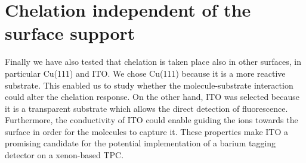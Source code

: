 \documentclass[aps,prl,reprint,longbibliography,superscriptaddress, english]{revtex4-1}
\newcommand{\completar}[1]{{\color{red} #1}}
\begin{document}





\section{Chelation independent of the surface support}

Finally we have also tested that chelation is taken place also in other surfaces, in particular Cu(111) and ITO. We chose Cu(111) because it is a more reactive substrate. This enabled us to study whether the molecule-substrate interaction could alter the chelation response. On the other hand, ITO was selected because it is a transparent substrate which allows the direct detection of fluorescence. Furthermore, the conductivity of ITO could enable guiding the \Bapp ions towards the surface in order for the molecules to capture it. These properties make ITO a promising candidate for the potential implementation of a barium tagging detector on a xenon-based TPC\cite{rivilla_fluorescent_2020}.


\end{document}
